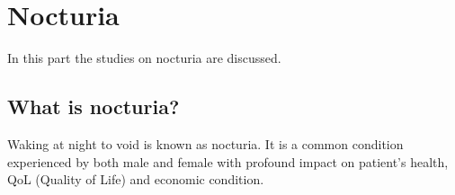 \section{Nocturia}

In this part the studies on nocturia are discussed. 

\subsection{What is nocturia?}

Waking at night to void is known as nocturia. It is a common condition experienced by both male and female with profound impact on patient's health, \gls{QoL} (Quality of Life) and economic condition. 